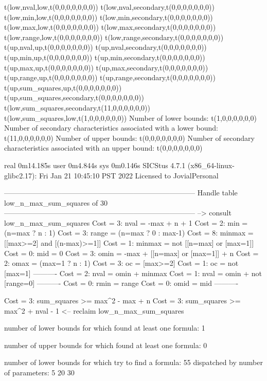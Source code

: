 t(low,nval,low,t(0,0,0,0,0,0,0))
t(low,nval,secondary,t(0,0,0,0,0,0,0))
t(low,min,low,t(0,0,0,0,0,0,0))
t(low,min,secondary,t(0,0,0,0,0,0,0))
t(low,max,low,t(0,0,0,0,0,0,0))
t(low,max,secondary,t(0,0,0,0,0,0,0))
t(low,range,low,t(0,0,0,0,0,0,0))
t(low,range,secondary,t(0,0,0,0,0,0,0))
t(up,nval,up,t(0,0,0,0,0,0,0))
t(up,nval,secondary,t(0,0,0,0,0,0,0))
t(up,min,up,t(0,0,0,0,0,0,0))
t(up,min,secondary,t(0,0,0,0,0,0,0))
t(up,max,up,t(0,0,0,0,0,0,0))
t(up,max,secondary,t(0,0,0,0,0,0,0))
t(up,range,up,t(0,0,0,0,0,0,0))
t(up,range,secondary,t(0,0,0,0,0,0,0))
t(up,sum_squares,up,t(0,0,0,0,0,0,0))
t(up,sum_squares,secondary,t(0,0,0,0,0,0,0))
t(low,sum_squares,secondary,t(11,0,0,0,0,0,0))
t(low,sum_squares,low,t(1,0,0,0,0,0,0))
Number of lower bounds:                                             t(1,0,0,0,0,0,0)
Number of secondary characteristics associated with a lower bound:  t(11,0,0,0,0,0,0)
Number of upper bounds:                                             t(0,0,0,0,0,0,0)
Number of secondary characteristics associated with an upper bound: t(0,0,0,0,0,0,0)

real	0m14.185s
user	0m4.844s
sys	0m0.146s
SICStus 4.7.1 (x86_64-linux-glibc2.17): Fri Jan 21 10:45:10 PST 2022
Licensed to JovialPersonal


--------------------------------------------------------------------------------
Handle table low_n_max_sum_squares of 30
--------------------------------------------------------------------------------
--> consult low_n_max_sum_squares
Cost =  3:  nval   = -max + n + 1
Cost =  2:  min    = (n=max ? n : 1)
Cost =  3:  range  = (n=max ? 0 : max-1)
Cost =  8:  minmax = [[max>=2] and [(n-max)>=1]]
Cost =  1:  minmax = not [[n=max] or [max=1]]
Cost =  0:  mid    = 0
Cost =  3:  omin   = -max + [[n=max] or [max=1]] + n %
Cost =  2:  omax   = (max=1 ? n : 1)
Cost =  3:  oc     = [max>=2]
Cost =  1:  oc     = not [max=1]
----------
Cost =  2:  nval   = omin + minmax
Cost =  1:  nval   = omin + not [range=0] %
----------
Cost =  0:  rmin   = range
Cost =  0:  omid   = mid
----------

Cost =  3:  sum_squares >= max^2 - max + n
Cost =  3:  sum_squares >= max^2 + nval - 1
<-- reclaim low_n_max_sum_squares

number of lower bounds for which found at least one formula: 1

number of upper bounds for which found at least one formula: 0

number of lower bounds for which try to find a formula: 55
dispatched by number of parameters: 5  20  30

